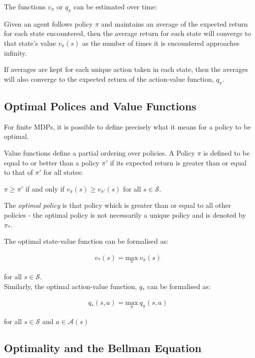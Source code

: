 \documentclass{article}
\begin{document}
The functions $v_\pi$ or $q_\pi$ can be estimated over time:

Given an agent follows policy $\pi$ and maintains an average of the expected return for each state encountered, then the average return for each state will converge to that state's value $v_\pi(s)$ as the number of times it is encountered approaches infinity\cite{RLNotes}.

If averages are kept for each unique action taken in each state, then the averages will also converge to the expected return of the action-value function, $q_\pi$\cite{Sutton1998}.

\subsection{Optimal Polices and Value Functions}

For finite MDPs, it is possible to define precisely what it means for a policy to be optimal\cite{Sutton1998}. 

Value functions define a partial ordering over policies. A Policy $\pi$ is defined to be equal to or better than a policy $\pi'$ if its expected return is greater than or equal to that of $\pi'$ for all states:

$\pi \geq \pi'$ if and only if $v_\pi(s) \geq v_{\pi'}(s)$ for all $s \in \mathcal{S}$.

The \textit{optimal policy} is that policy which is greater than or equal to all other policies - the optimal policy is not necessarily a unique policy and is denoted by $\pi_*$. 

The optimal state-value function can be formalised as: 

\begin{align}
    v_*(s) = \underset{\pi}{\text{max}}\ v_\pi(s)
\end{align}

for all $s \in \mathcal{S}$. \\


Similarly, the optimal action-value function, $q_*$ can be formalised as: 

\begin{align}
        q_*(s, a) = \underset{\pi}{\text{max}}\ q_\pi(s, a)
\end{align}

for all $s \in \mathcal{S}$ and $a \in \mathcal{A}(s)$


\subsection{Optimality and the Bellman Equation}
\end{document}
